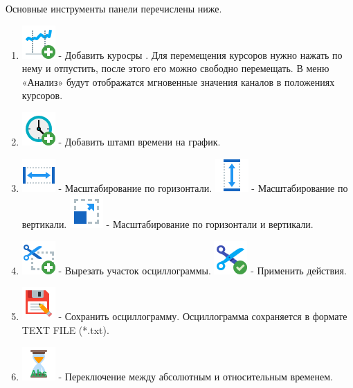 \documentclass[a4paper,12pt]{article}
\begin{document}
Основные инструменты панели перечислены ниже.
\begin{enumerate}
\item \includegraphics[width=4ex]{image/Stocks_Add.png} - Добавить куросры . Для перемещения курсоров нужно нажать по нему и отпустить, после этого его можно свободно перемещать. В меню «Анализ» будут отображатся мгновенные значения каналов в положениях курсоров. 
\item \includegraphics[width=4ex]{image/Watch_Add.png} - Добавить штамп времени на график.
\item \includegraphics[width=4ex]{image/Width-48.png} - Масштабирование по горизонтали.
        \includegraphics[width=4ex]{image/Height-48.png} - Масштабирование по вертикали. 
	  \includegraphics[width=4ex]{image/Resize-48.png} - Масштабирование по горизонтали и вертикали.
\item \includegraphics[width=4ex]{image/Cutting_Add.png} - Вырезать участок осциллограммы.
	 \includegraphics[width=4ex]{image/Cut_Apply.png} - Применить действия.
\item \includegraphics[width=4ex]{image/Save_as_48.png} - Сохранить осциллограмму. Осциллограмма сохраняется в формате TEXT FILE (*.txt). 
\item \includegraphics[width=4ex]{image/Time_abs.png} - Переключение между абсолютным и относительным временем. 
\end {enumerate}
\end{document}
